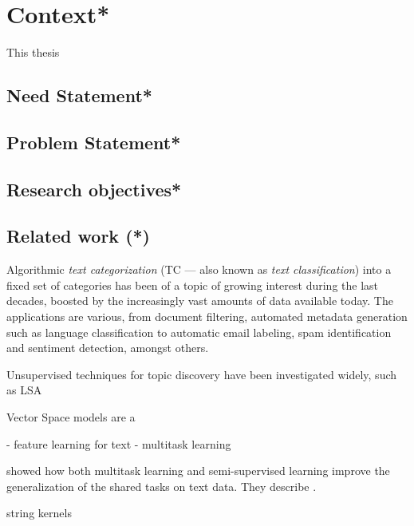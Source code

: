 
\clearpage
\section{Context*}

This thesis

\cite{Do:2006aa}


\subsection{Need Statement*}

\subsection{Problem Statement*}

\subsection{Research objectives*}

\subsection{Related work (*)}


Algorithmic \emph{text categorization} (TC --- also known as \emph{text classification}) into a fixed set of categories has been of a topic of growing interest during the last decades, boosted by the increasingly vast amounts of data available today. The applications are various, from document filtering, automated metadata generation such as language classification to automatic email labeling, spam identification and sentiment detection, amongst others.

Unsupervised techniques for topic discovery have been investigated widely, such as LSA

Vector Space models are a

- feature learning for text
- multitask learning


\cite{Collobert:2008aa} showed how both multitask learning and semi-supervised learning improve the generalization of the shared tasks on text data. They describe .



\cite{Lodhi:2002aa} string kernels

